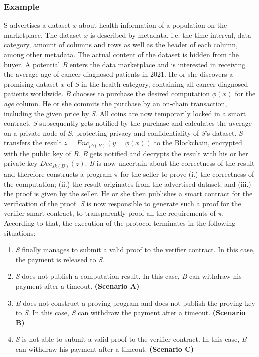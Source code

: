 \subsubsection{Example}

S advertises a dataset $x$ about health information of a population on the marketplace. The dataset $x$ is described by metadata, i.e. the time interval, data category, amount of columns and rows as well as the header of each column, among other metadata. The actual content of the dataset is hidden from the buyer. A potential \emph{B} enters the data marketplace and is interested in receiving the average age of cancer diagnosed patients in 2021. He or she discovers a promising dataset $x$ of \emph{S} in the health category, containing all cancer diagnosed patients worldwide. \emph{B} chooses to purchase the desired computation $\phi(x)$ for the \emph{age} column. He or she commits the purchase by an on-chain transaction, including the given price by \emph{S}. All coins are now temporarily locked in a smart contract. \emph{S} subsequently gets notified by the purchase and calculates the average on a private node of \emph{S}, protecting privacy and confidentiality of \emph{S}'s dataset. \emph{S} transfers the result $z = Enc_{pb(B)}(y=\phi(x))$ to the Blockchain, encrypted with the public key of \emph{B}. \emph{B} gets notified and decrypts the result with his or her private key $Dec_{sk(B)}(z)$. \emph{B} is now uncertain about the correctness of the result and therefore constructs a program $\pi$ for the seller to prove (i.) the correctness of the computation; (ii.) the result originates from the advertised dataset; and (iii.) the proof is given by the seller. He or she then publishes a smart contract for the verification of the proof. \emph{S} is now responsible to generate such a proof for the verifier smart contract, to transparently proof all the requirements of $\pi$. According to that, the execution of the protocol terminates in the following situations:

\newpage
\begin{enumerate}
    \item \emph{S} finally manages to submit a valid proof to the verifier contract. In this case, the payment is released to \emph{S}.
    \item \emph{S} does not publish a computation result. In this case, \emph{B} can withdraw his payment after a timeout. \textbf{(Scenario A)}
    \item \emph{B} does not construct a proving program and does not publish the proving key to \emph{S}. In this case, \emph{S} can withdraw the payment after a timeout. \textbf{(Scenario B)}
    \item \emph{S} is not able to submit a valid proof to the verifier contract. In this case, \emph{B} can withdraw his payment after a timeout. \textbf{(Scenario C)}
\end{enumerate}

